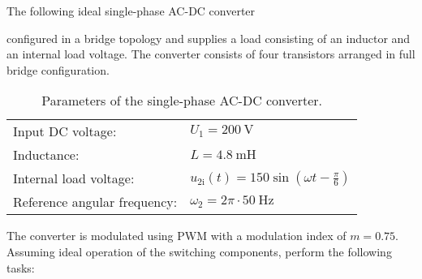 

The following ideal single-phase AC-DC converter
 

configured in a bridge topology and supplies a load consisting of an inductor and an internal load voltage. The converter consists
of four transistors arranged in full bridge configuration.

\begin{table}[ht]
    \centering  %
    \begin{tabular}{ll}
        \toprule
        Input DC voltage: & $U_{\mathrm{1}}=\SI{200}{\volt}$ \\
        Inductance: & $L = \SI{4.8}{\milli \henry}$ \\
        Internal load voltage: & $u_{2\mathrm{i}}(t) = 150 \sin(\omega t - \frac{\pi}{6})$ \\ 
        Reference angular frequency: & $\omega_2 = 2\pi \cdot \SI{50}{\hertz}$ \\ 
        \bottomrule
    \end{tabular}
    \caption{Parameters of the single-phase AC-DC converter.}  
    \label{table:ex07_Task1_ParametersOfTheCircuit}
\end{table}
The converter is modulated using PWM with a modulation index of $m=0.75$.  Assuming ideal operation of the switching components, perform the following tasks:


